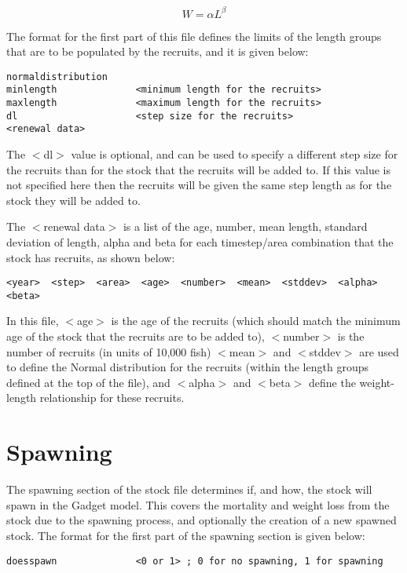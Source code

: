 \documentclass [a4paper, 10pt]{book}
\begin{document}
\begin{equation}\label{eq:wlen}
W = \alpha L ^\beta
\end{equation}

The format for the first part of this file defines the limits of the length groups that are to be populated by the recruits, and it is given below:

{\small\begin{verbatim}
normaldistribution
minlength              <minimum length for the recruits>
maxlength              <maximum length for the recruits>
dl                     <step size for the recruits>
<renewal data>
\end{verbatim}}

The $<$dl$>$ value is optional, and can be used to specify a different step size for the recruits than for the stock that the recruits will be added to.  If this value is not specified here then the recruits will be given the same step length as for the stock they will be added to.

\bigskip
The $<$renewal data$>$ is a list of the age, number, mean length, standard deviation of length, alpha and beta for each timestep/area combination that the stock has recruits, as shown below:

{\small\begin{verbatim}
<year>  <step>  <area>  <age>  <number>  <mean>  <stddev>  <alpha>  <beta>
\end{verbatim}}

In this file, $<$age$>$ is the age of the recruits (which should match the minimum age of the stock that the recruits are to be added to), $<$number$>$ is the number of recruits (in units of 10,000 fish) $<$mean$>$ and $<$stddev$>$ are used to define the Normal distribution for the recruits (within the length groups defined at the top of the file), and $<$alpha$>$ and $<$beta$>$ define the weight-length relationship for these recruits.

\section{Spawning}\label{subsec:stockspawn}
The spawning section of the stock file determines if, and how, the stock will spawn in the Gadget model.   This covers the mortality and weight loss from the stock due to the spawning process, and optionally the creation of a new spawned stock.  The format for the first part of the spawning section is given below:

{\small\begin{verbatim}
doesspawn              <0 or 1> ; 0 for no spawning, 1 for spawning
\end{verbatim}}
\end{document}
